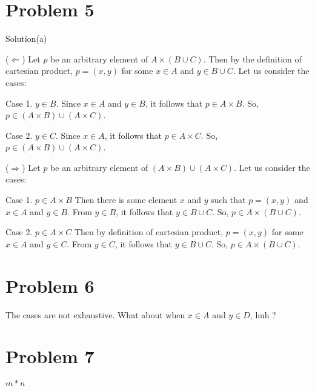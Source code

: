 \documentclass{article}
\begin{document}
\section{Problem 5}

Solution(a)

($ \Leftarrow $) Let $p$ be an arbitrary element of $A \times (B \cup C)$. Then by the
definition of cartesian product, $p = (x,y)$ for some $x \in A$ and $y
\in B \cup C$. Let us consider the cases:

Case 1. $y \in B$. Since $x \in A$ and $y \in B$, it follows that $p
\in A \times B$. So, $p \in (A \times B) \cup (A \times C)$.

Case 2. $y \in C$. Since $x \in A$, it follows that $p \in A \times
C$. So, $p \in (A \times B) \cup (A \times C)$.

($ \Rightarrow $) Let $p$ be an arbitrary element of $(A \times B)
\cup (A \times C)$. Let us consider the cases:

Case 1. $p \in A \times B$ Then there is some element $x$ and $y$ such
that $p = (x,y)$ and $x \in A$ and $y \in B$. From $y \in B$, it
follows that $y \in B \cup C$. So, $p \in A \times (B \cup C)$.

Case 2. $p \in A \times C$ Then by definition of cartesian product, $p
= (x,y)$ for some $x \in A$ and $y \in C$. From $y \in C$, it follows
that $y \in B \cup C$. So, $p \in A \times (B \cup C)$.

\section{Problem 6}

The cases are not exhaustive. What about when $x \in A$ and $y \in D$,
huh ?

\section{Problem 7}

$ m * n$
\end{document}
